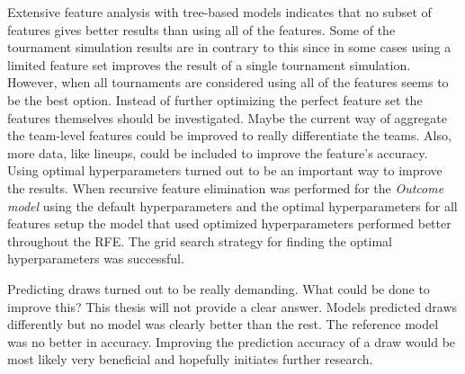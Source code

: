 Extensive feature analysis with tree-based models indicates that no subset of features gives better results than using all of the features. Some of the tournament simulation results are in contrary to this since in some cases using a limited feature set improves the result of a single tournament simulation. However, when all tournaments are considered using all of the features seems to be the best option. Instead of further optimizing the perfect feature set the features themselves should be investigated. Maybe the current way of aggregate the team-level features could be improved to really differentiate the teams. Also, more data, like lineups, could be included to improve the feature's accuracy. Using optimal hyperparameters turned out to be an important way to improve the results. When recursive feature elimination was performed for the  \textit{Outcome model} using the default hyperparameters and the optimal hyperparameters for all features setup the model that used optimized hyperparameters performed better throughout the RFE. The grid search strategy for finding the optimal hyperparameters was successful.

Predicting draws turned out to be really demanding. What could be done to improve this? This thesis will not provide a clear answer. Models predicted draws differently but no model was clearly better than the rest. The reference model was no better in accuracy. Improving the prediction accuracy of a draw would be most likely very beneficial and hopefully initiates further research.
